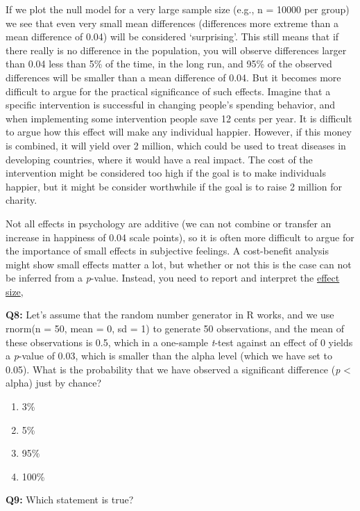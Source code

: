 \documentclass[
  oneside]{book}
\providecommand{\tightlist}{%
  \setlength{\itemsep}{0pt}\setlength{\parskip}{0pt}}
\begin{document}
If we plot the null model for a very large sample size (e.g., n = 10000 per group) we see that even very small mean differences (differences more extreme than a mean difference of 0.04) will be considered `surprising'. This still means that if there really is no difference in the population, you will observe differences larger than 0.04 less than 5\% of the time, in the long run, and 95\% of the observed differences will be smaller than a mean difference of 0.04. But it becomes more difficult to argue for the practical significance of such effects. Imagine that a specific intervention is successful in changing people's spending behavior, and when implementing some intervention people save 12 cents per year. It is difficult to argue how this effect will make any individual happier. However, if this money is combined, it will yield over 2 million, which could be used to treat diseases in developing countries, where it would have a real impact. The cost of the intervention might be considered too high if the goal is to make individuals happier, but it might be consider worthwhile if the goal is to raise 2 million for charity.

Not all effects in psychology are additive (we can not combine or transfer an increase in happiness of 0.04 scale points), so it is often more difficult to argue for the importance of small effects in subjective feelings. A cost-benefit analysis might show small effects matter a lot, but whether or not this is the case can not be inferred from a \emph{p}-value. Instead, you need to report and interpret the \protect\hyperlink{effectsize}{effect size},

\textbf{Q8:} Let's assume that the random number generator in R works, and we use rnorm(n = 50, mean = 0, sd = 1) to generate 50 observations, and the mean of these observations is 0.5, which in a one-sample \emph{t}-test against an effect of 0 yields a \emph{p}-value of 0.03, which is smaller than the alpha level (which we have set to 0.05). What is the probability that we have observed a significant difference (\emph{p} \textless{} alpha) just by chance?

\begin{enumerate}
\def\labelenumi{\Alph{enumi})}
\tightlist
\item
  3\%
\item
  5\%
\item
  95\%
\item
  100\%
\end{enumerate}

\textbf{Q9:} Which statement is true?
\end{document}
